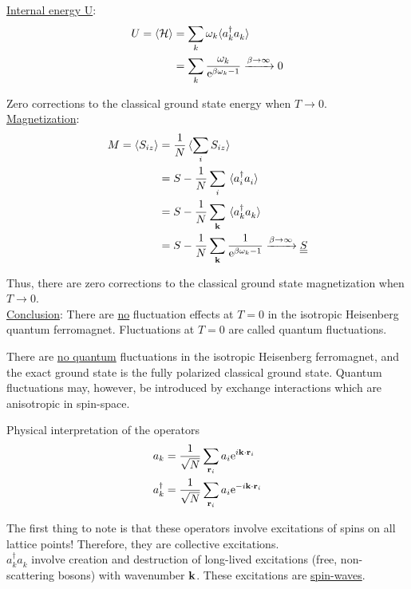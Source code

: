 \uline{Internal energy U}:
\begin{align}
	U = \langle \mathcal{H} \rangle &= \sum_k \omega_k \langle a_k^\dagger a_k^{} \rangle \\
	&= \sum_k \frac{\omega_k}{\mathrm{e}^{\beta \omega_k - 1 }} \xrightarrow{\beta \rightarrow \infty} 0 
\end{align}

Zero corrections to the classical ground state energy when $T \rightarrow 0$. \\

\uline{Magnetization}:
\begin{align}
	M = 
	\ev{S_{iz}}&= \frac{1}{N} \ev*{\sum_i S_{iz}} \\
	&= S - \frac{1}{N} \sum_i \ev*{a_i^\dagger a_i^{}}\\
	&= S - \frac{1}{N} \sum_{\vb{k}} \ev*{a_k^\dagger a_k^{}} \\
	&= S - \frac{1}{N} \sum_{\vb{k}} \frac{1}{\e^{\beta \omega_k - 1}} \xrightarrow{\beta \rightarrow \infty} \uline{\uline{ S }}
\end{align}

Thus, there are zero corrections to the classical ground state magnetization when $T \rightarrow 0$. \\

\uline{Conclusion}: There are \uline{no} fluctuation effects at $T = 0$ in the isotropic Heisenberg quantum ferromagnet. Fluctuations at $T = 0$ are called quantum fluctuations.

\begin{tcolorbox}
	There are \uline{no quantum} fluctuations in the isotropic Heisenberg ferromagnet, and the exact ground state is the fully polarized classical ground state. Quantum fluctuations may, however, be introduced by exchange interactions which are anisotropic in spin-space.  
\end{tcolorbox}

Physical interpretation of the operators
\begin{align}
	a_k &= \frac{1}{\sqrt{N}}\sum_{\vb{r}_i}a_i \mathrm{e}^{i \vb{k} \cdot \vb{r}_i} \\
	a_k^\dagger &= \frac{1}{\sqrt{N}}\sum_{\vb{r}_i}a_i \mathrm{e}^{-i \vb{k} \cdot \vb{r}_i}
\end{align}

The first thing to note is that these operators involve excitations of spins on all lattice points! Therefore, they are collective excitations. \\
$a_k^\dagger a_k^{}$ involve creation and destruction of long-lived excitations (free, non-scattering bosons) with wavenumber $\vb{k}$. These excitations are \uline{spin-waves}. \\

